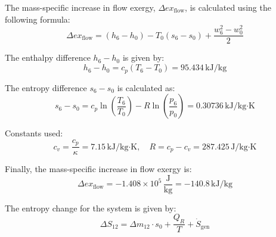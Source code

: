 The mass-specific increase in flow exergy, \( \Delta ex_{\text{flow}} \), is calculated using the following formula:  
\[
\Delta ex_{\text{flow}} = (h_6 - h_0) - T_0 (s_6 - s_0) + \frac{w_6^2 - w_0^2}{2}
\]

The enthalpy difference \( h_6 - h_0 \) is given by:  
\[
h_6 - h_0 = c_p (T_6 - T_0) = 95.434 \, \text{kJ/kg}
\]

The entropy difference \( s_6 - s_0 \) is calculated as:  
\[
s_6 - s_0 = c_p \ln \left( \frac{T_6}{T_0} \right) - R \ln \left( \frac{p_6}{p_0} \right) = 0.30736 \, \text{kJ/kg·K}
\]

Constants used:  
\[
c_v = \frac{c_p}{\kappa} = 7.15 \, \text{kJ/kg·K}, \quad R = c_p - c_v = 287.425 \, \text{J/kg·K}
\]

Finally, the mass-specific increase in flow exergy is:  
\[
\Delta ex_{\text{flow}} = -1.408 \times 10^5 \, \frac{\text{J}}{\text{kg}} = -140.8 \, \text{kJ/kg}
\]

The entropy change for the system is given by:  
\[
\Delta S_{12} = \Delta m_{12} \cdot s_0 + \frac{Q_R}{T} + \dot{S}_{\text{gen}}
\]
